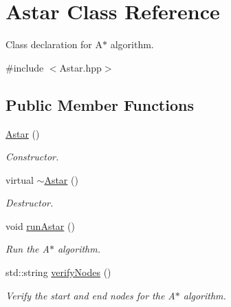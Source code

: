 \hypertarget{class_astar}{}\section{Astar Class Reference}
\label{class_astar}


Class declaration for A$\ast$ algorithm.  




{\ttfamily \#include $<$Astar.\+hpp$>$}

\subsection*{Public Member Functions}
\begin{DoxyCompactItemize}
\item 
\mbox{\label{class_astar_a0e59f5e736107ddea7cc16dd5e4a2d88}} 
\mbox{\hyperlink{class_astar_a0e59f5e736107ddea7cc16dd5e4a2d88}{Astar}} ()
\begin{DoxyCompactList}\small\item\em Constructor. \end{DoxyCompactList}\item 
\mbox{\label{class_astar_ac7df7136e93c1f902b3e3602d0add30c}} 
virtual \mbox{\hyperlink{class_astar_ac7df7136e93c1f902b3e3602d0add30c}{$\sim$\+Astar}} ()
\begin{DoxyCompactList}\small\item\em Destructor. \end{DoxyCompactList}\item 
void \mbox{\hyperlink{class_astar_aa0213700144005010364b7723edee3e7}{run\+Astar}} ()
\begin{DoxyCompactList}\small\item\em Run the A$\ast$ algorithm. \end{DoxyCompactList}\item 
std\+::string \mbox{\hyperlink{class_astar_a0a5748c39ed15854ad09e8c6a51a2205}{verify\+Nodes}} ()
\begin{DoxyCompactList}\small\item\em Verify the start and end nodes for the A$\ast$ algorithm. \end{DoxyCompactList}\end{DoxyCompactItemize}

